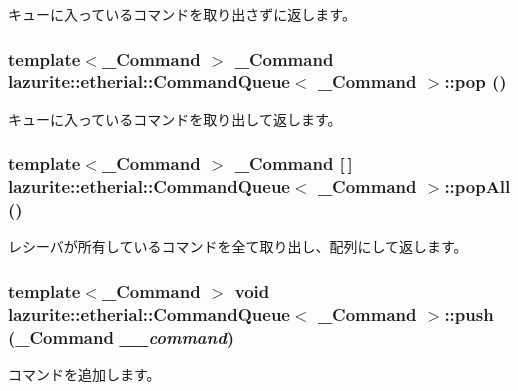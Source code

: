 \label{classlazurite_1_1etherial_1_1_command_queue_3_01___command_01_4_a931227fc5def14ac815a5474dd3f10b7}
キューに入っているコマンドを取り出さずに返します。 \hypertarget{classlazurite_1_1etherial_1_1_command_queue_3_01___command_01_4_a8467677d37f0282b96ec871f7eedb66d}{
\subsubsection[{pop}]{\setlength{\rightskip}{0pt plus 5cm}template$<$\_\-Command $>$ \_\-Command lazurite::etherial::CommandQueue$<$ \_\-Command $>$::pop ()}}
\label{classlazurite_1_1etherial_1_1_command_queue_3_01___command_01_4_a8467677d37f0282b96ec871f7eedb66d}
キューに入っているコマンドを取り出して返します。 \hypertarget{classlazurite_1_1etherial_1_1_command_queue_3_01___command_01_4_a14bef7e5ebd9c06839a48e9bd5c0cbca}{
\subsubsection[{popAll}]{\setlength{\rightskip}{0pt plus 5cm}template$<$\_\-Command $>$ \_\-Command \mbox{[}$\,$\mbox{]} lazurite::etherial::CommandQueue$<$ \_\-Command $>$::popAll ()}}
\label{classlazurite_1_1etherial_1_1_command_queue_3_01___command_01_4_a14bef7e5ebd9c06839a48e9bd5c0cbca}
レシーバが所有しているコマンドを全て取り出し、配列にして返します。 \hypertarget{classlazurite_1_1etherial_1_1_command_queue_3_01___command_01_4_a89d41ddb410fd25b3e0e7155d364b09c}{
\subsubsection[{push}]{\setlength{\rightskip}{0pt plus 5cm}template$<$\_\-Command $>$ void lazurite::etherial::CommandQueue$<$ \_\-Command $>$::push (\_\-Command {\em \_\-\_\-command})}}
\label{classlazurite_1_1etherial_1_1_command_queue_3_01___command_01_4_a89d41ddb410fd25b3e0e7155d364b09c}
コマンドを追加します。 

